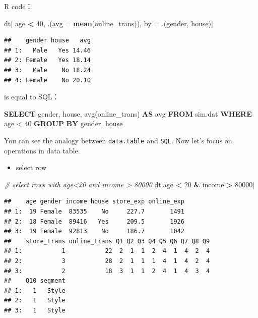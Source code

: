 \documentclass[12pt,]{krantz}
\newenvironment{Shaded}{\begin{snugshade}}{\end{snugshade}}
\newcommand{\KeywordTok}[1]{\textcolor[rgb]{0.13,0.29,0.53}{\textbf{#1}}}
\newcommand{\DataTypeTok}[1]{\textcolor[rgb]{0.13,0.29,0.53}{#1}}
\newcommand{\DecValTok}[1]{\textcolor[rgb]{0.00,0.00,0.81}{#1}}
\newcommand{\StringTok}[1]{\textcolor[rgb]{0.31,0.60,0.02}{#1}}
\newcommand{\CommentTok}[1]{\textcolor[rgb]{0.56,0.35,0.01}{\textit{#1}}}
\newcommand{\FunctionTok}[1]{\textcolor[rgb]{0.00,0.00,0.00}{#1}}
\newcommand{\OperatorTok}[1]{\textcolor[rgb]{0.81,0.36,0.00}{\textbf{#1}}}
\newcommand{\NormalTok}[1]{#1}
\providecommand{\tightlist}{%
  \setlength{\itemsep}{0pt}\setlength{\parskip}{0pt}}
\theoremstyle{definition}
\theoremstyle{definition}
\theoremstyle{definition}
\theoremstyle{remark}
\begin{document}
R code：

\begin{Shaded}
\begin{Highlighting}[]
\NormalTok{dt[ age }\OperatorTok{<}\StringTok{ }\DecValTok{40}\NormalTok{, .(}\DataTypeTok{avg =} \KeywordTok{mean}\NormalTok{(online_trans)), by =}\StringTok{ }\NormalTok{.(gender, house)]}
\end{Highlighting}
\end{Shaded}

\begin{verbatim}
##    gender house   avg
## 1:   Male   Yes 14.46
## 2: Female   Yes 18.14
## 3:   Male    No 18.24
## 4: Female    No 20.10
\end{verbatim}

is equal to SQL：

\begin{Shaded}
\begin{Highlighting}[]
\KeywordTok{SELECT}\NormalTok{ gender, house, }\FunctionTok{avg}\NormalTok{(online_trans) }\KeywordTok{AS} \FunctionTok{avg} \KeywordTok{FROM}\NormalTok{ sim.dat }\KeywordTok{WHERE}\NormalTok{ age < }\DecValTok{40} \KeywordTok{GROUP} \KeywordTok{BY}\NormalTok{ gender, house}
\end{Highlighting}
\end{Shaded}

You can see the analogy between \texttt{data.table} and \texttt{SQL}.
Now let's focus on operations in data table.

\begin{itemize}
\tightlist
\item
  select row
\end{itemize}

\begin{Shaded}
\begin{Highlighting}[]
\CommentTok{# select rows with age<20 and income > 80000}
\NormalTok{dt[age }\OperatorTok{<}\StringTok{ }\DecValTok{20} \OperatorTok{&}\StringTok{ }\NormalTok{income }\OperatorTok{>}\StringTok{ }\DecValTok{80000}\NormalTok{]}
\end{Highlighting}
\end{Shaded}

\begin{verbatim}
##    age gender income house store_exp online_exp
## 1:  19 Female  83535    No     227.7       1491
## 2:  18 Female  89416   Yes     209.5       1926
## 3:  19 Female  92813    No     186.7       1042
##    store_trans online_trans Q1 Q2 Q3 Q4 Q5 Q6 Q7 Q8 Q9
## 1:           1           22  2  1  1  2  4  1  4  2  4
## 2:           3           28  2  1  1  1  4  1  4  2  4
## 3:           2           18  3  1  1  2  4  1  4  3  4
##    Q10 segment
## 1:   1   Style
## 2:   1   Style
## 3:   1   Style
\end{verbatim}
\end{document}
